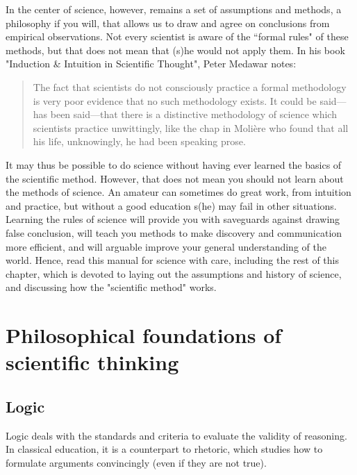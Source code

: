 \documentclass{tufte-book}
\begin{document}
In the center of science, however, remains a set of assumptions and methods, a philosophy if you will, that allows us to draw and agree on conclusions from empirical observations. Not every scientist is aware of the ``formal rules" of these methods, but that does not mean that (s)he would not apply them. In his book "Induction \& Intuition in Scientific Thought", Peter Medawar notes: 

\begin{quote}
The fact that scientists do not consciously practice a formal methodology is very poor evidence that no such methodology exists. It could be said—has been said—that there is a distinctive methodology of science which scientists practice unwittingly, like the chap in Molière who found that all his life, unknowingly, he had been speaking prose.
\end{quote}

It may thus be possible to do science without having ever learned the basics of the scientific method. However, that does not mean you should not learn about the methods of science. An amateur can sometimes do great work, from intuition and practice, but without a good education s(he) may fail in other situations. Learning the rules of science will provide you with saveguards against drawing false conclusion, will teach you methods to make discovery and communication more efficient, and will arguable improve your general understanding of the world. Hence, read this manual for science with care, including the  rest of this chapter, which is devoted to laying out the assumptions and history of science, and discussing how the "scientific method" works. 


\section{Philosophical foundations of scientific thinking}



\subsection{Logic}

Logic deals with the standards and criteria to evaluate the validity of reasoning. In classical education, it is a counterpart to rhetoric, which studies how to formulate arguments convincingly (even if they are not true). 
\end{document}
